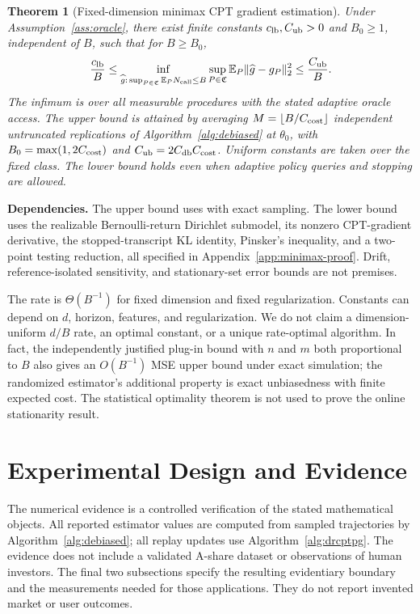 \documentclass[11pt]{article}
\newtheorem{theorem}{Theorem}[section]
\newcommand{\E}{\mathbb E}
\newcommand{\1}{\mathbf 1}
\DeclarePairedDelimiter{\norm}{\lVert}{\rVert}
\newcommand{\db}{\mathrm{db}}
\theoremstyle{definition}
\newcommand{\dependson}[1]{\par\noindent\textbf{Dependencies.} #1\par\smallskip}
\begin{document}
\begin{theorem}[Fixed-dimension minimax CPT gradient estimation]\label{thm:minimax}
Under Assumption~\ref{ass:oracle}, there exist finite constants $c_{\rm lb},C_{\rm ub}>0$ and $B_0\ge1$, independent of $B$, such that for $B\ge B_0$,
\begin{equation}\label{eq:minimax}
 \frac{c_{\rm lb}}B\le
 \inf_{\widehat g:\,\sup_{P\in\mathfrak C}\E_P N_{\rm call}\le B}
 \sup_{P\in\mathfrak C}\E_P\norm{\widehat g-g_P}_2^2
 \le\frac{C_{\rm ub}}B.
\end{equation}
The infimum is over all measurable procedures with the stated adaptive oracle access. The upper bound is attained by averaging
$M=\lfloor B/C_{\rm cost}\rfloor$ independent untruncated replications of Algorithm~\ref{alg:debiased} at $\theta_0$, with
$B_0=\max(1,2C_{\rm cost})$ and $C_{\rm ub}=2C_{\db}C_{\rm cost}$. Uniform constants are taken over the fixed class. The lower bound holds even when adaptive policy queries and stopping are allowed.
\end{theorem}
\dependson{The upper bound uses  with exact sampling. The lower bound uses the realizable Bernoulli-return Dirichlet submodel, its nonzero CPT-gradient derivative, the stopped-transcript KL identity, Pinsker's inequality, and a two-point testing reduction, all specified in Appendix~\ref{app:minimax-proof}. Drift, reference-isolated sensitivity, and stationary-set error bounds are not premises.}

The rate is $\Theta(B^{-1})$ for fixed dimension and fixed regularization. Constants can depend on $d$, horizon, features, and regularization. We do not claim a dimension-uniform $d/B$ rate, an optimal constant, or a unique rate-optimal algorithm. In fact, the independently justified plug-in bound with $n$ and $m$ both proportional to $B$ also gives an $O(B^{-1})$ MSE upper bound under exact simulation; the randomized estimator's additional property is exact unbiasedness with finite expected cost. The statistical optimality theorem is not used to prove the online stationarity result.


\section{Experimental Design and Evidence}\label{sec:experiments}
The numerical evidence is a controlled verification of the stated mathematical objects. All reported estimator values are computed from sampled trajectories by Algorithm~\ref{alg:debiased}; all replay updates use Algorithm~\ref{alg:drcptpg}. The evidence does not include a validated A-share dataset or observations of human investors. The final two subsections specify the resulting evidentiary boundary and the measurements needed for those applications. They do not report invented market or user outcomes.
\end{document}
